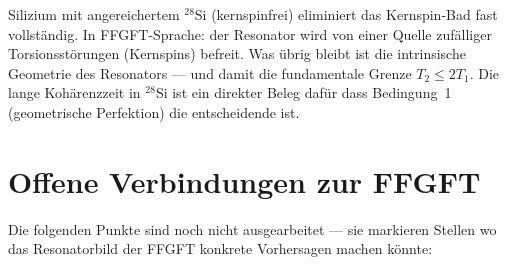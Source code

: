 \begin{center}
\end{center}

\begin{keyresult}
Silizium mit angereichertem $^{28}$Si (kernspinfrei)
eliminiert das Kernspin-Bad fast vollständig.
In FFGFT-Sprache: der Resonator wird von einer
Quelle zufälliger Torsionsstörungen (Kernspins)
befreit. Was übrig bleibt ist die intrinsische
Geometrie des Resonators --- und damit
die fundamentale Grenze $T_2 \leq 2T_1$.
Die lange Kohärenzzeit in $^{28}$Si ist ein
direkter Beleg dafür dass Bedingung~1
(geometrische Perfektion) die entscheidende ist.
\end{keyresult}

\section{Offene Verbindungen zur FFGFT}
\label{sec:offene-verbindungen}

Die folgenden Punkte sind noch nicht ausgearbeitet ---
sie markieren Stellen wo das Resonatorbild der FFGFT
konkrete Vorhersagen machen könnte:


